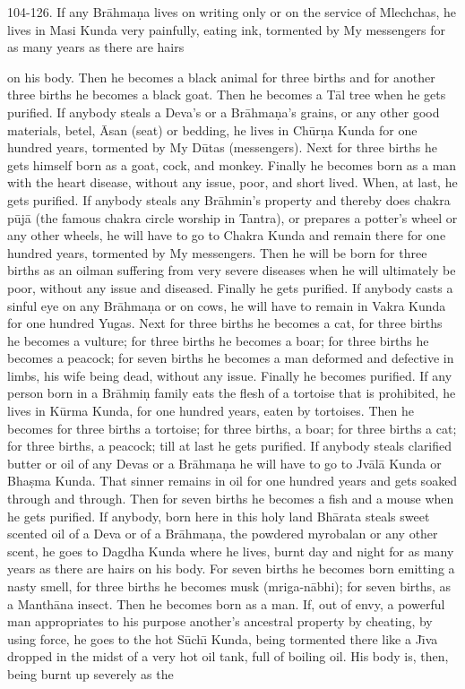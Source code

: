 104-126. If any Br\=ahma\d{n}a lives on writing only or on the service of Mlechchas, he lives in Masi Kunda very painfully, eating ink, tormented by My messengers for as many years as there are hairs

on his body. Then he becomes a black animal for three births and for another three births he becomes a black goat. Then he becomes a T\=al tree when he gets purified. If anybody steals a Deva's or
a Br\=ahma\d{n}a's grains, or any other good materials, betel, \=Asan (seat) or bedding, he lives in Ch\=ur\d{n}a Kunda for one hundred years, tormented by My D\=utas (messengers). Next for three births he gets
himself born as a goat, cock, and monkey. Finally he becomes born as a man with the heart disease, without any issue, poor, and short lived. When, at last, he gets purified. If anybody steals any Br\=ahmin's property and thereby does chakra p\=uj\=a (the famous chakra circle worship in Tantra), or prepares a potter's wheel or any other wheels, he will have to go to Chakra Kunda and remain there for one hundred years, tormented by My messengers. Then he will be born for three births as an oilman suffering from very severe diseases when he will ultimately be poor, without any issue and diseased. Finally he gets purified. If anybody casts a sinful eye on any Br\=ahma\d{n}a or on cows, he will have to remain in Vakra Kunda for one hundred Yugas. Next for three births he becomes a cat, for three births he becomes a vulture; for three births he becomes a boar; for three births he becomes a peacock; for seven births he becomes a man deformed and defective in limbs, his wife being dead, without any issue. Finally he becomes purified. If any person born in a Br\=ahmi\d{n} family eats the flesh of a tortoise that is prohibited, he lives in K\=urma Kunda, for one hundred years, eaten by tortoises. Then he becomes for three births a tortoise; for three births, a boar; for three births a cat; for three births, a peacock; till at last he gets purified. If anybody steals clarified butter or oil of any Devas or a Br\=ahma\d{n}a he will have to go to Jv\=al\=a Kunda or Bha\d{s}ma Kunda. That sinner remains in oil for one hundred years and gets soaked through and through. Then for seven births he becomes a fish and a mouse when he gets purified. If anybody, born here in this holy land Bh\=arata steals sweet scented oil of a Deva or of a Br\=ahma\d{n}a, the powdered myrobalan or any other scent, he goes to Dagdha Kunda where he lives, burnt day and night for as many years as there are hairs on his body. For seven births he becomes born emitting a nasty smell, for three births he becomes musk (mriga-n\=abhi); for seven births, as a Manth\=ana insect. Then he becomes born as a man. If, out of envy, a powerful man appropriates to his purpose another's ancestral property by cheating, by using force, he goes to the hot S\=uch\={\i} Kunda, being tormented there like a J\={\i}va dropped in the midst of a very hot oil tank, full of boiling oil. His body is, then, being burnt up severely as the

